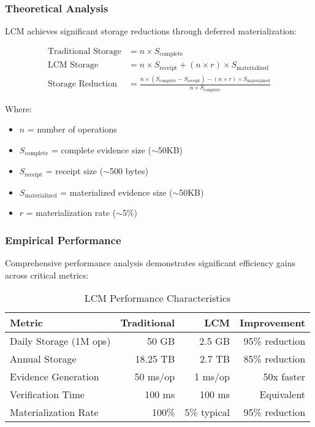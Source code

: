 \documentclass[12pt,a4paper]{article}
\begin{document}
\subsubsection{Theoretical Analysis}

LCM achieves significant storage reductions through deferred materialization:

\begin{align}
\text{Traditional Storage} &= n \times S_{\text{complete}} \\
\text{LCM Storage} &= n \times S_{\text{receipt}} + (n \times r) \times S_{\text{materialized}} \\
\text{Storage Reduction} &= \frac{n \times (S_{\text{complete}} - S_{\text{receipt}}) - (n \times r) \times S_{\text{materialized}}}{n \times S_{\text{complete}}}
\end{align}

Where:
\begin{itemize}
\item $n$ = number of operations
\item $S_{\text{complete}}$ = complete evidence size ($\sim$50KB)
\item $S_{\text{receipt}}$ = receipt size ($\sim$500 bytes)  
\item $S_{\text{materialized}}$ = materialized evidence size ($\sim$50KB)
\item $r$ = materialization rate ($\sim$5\%)
\end{itemize}

\subsubsection{Empirical Performance}

Comprehensive performance analysis demonstrates significant efficiency gains across critical metrics:

\begin{table}[H]
\centering
\begin{tabular}{lrrr}
\toprule
\textbf{Metric} & \textbf{Traditional} & \textbf{LCM} & \textbf{Improvement} \\
\midrule
Daily Storage (1M ops) & 50 GB & 2.5 GB & 95\% reduction \\
Annual Storage & 18.25 TB & 2.7 TB & 85\% reduction \\
Evidence Generation & 50 ms/op & 1 ms/op & 50x faster \\
Verification Time & 100 ms & 100 ms & Equivalent \\
Materialization Rate & 100\% & 5\% typical & 95\% reduction \\
\bottomrule
\end{tabular}
\caption{LCM Performance Characteristics}
\label{tab:performance}
\end{table}
\end{document}
